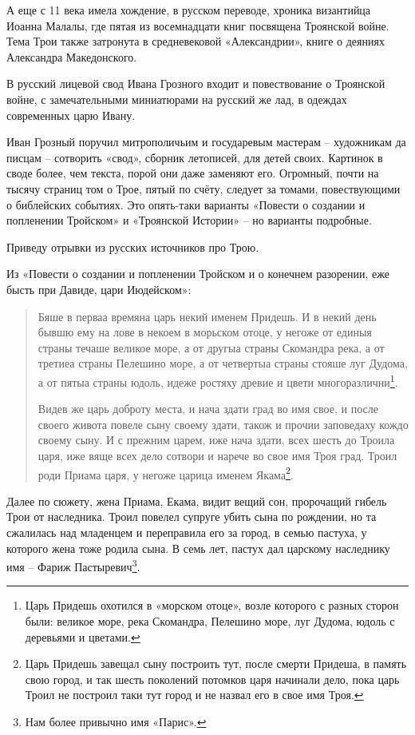 А еще с 11 века имела хождение, в русском переводе, хроника византийца Иоанна Малалы\cite{malala01}, где пятая из восемнадцати книг посвящена Троянской войне. Тема Трои также затронута в средневековой «Александрии», книге о деяниях Александра Македонского.

В русский лицевой свод Ивана Грозного входит и повествование о Троянской войне, с замечательными миниатюрами на русский же лад, в одеждах современных царю Ивану.

Иван Грозный поручил митрополичьим и государевым мастерам – художникам да писцам – сотворить «свод», сборник летописей, для детей своих. Картинок в своде более, чем текста, порой они даже заменяют его. Огромный, почти на тысячу страниц том о Трое, пятый по счёту, следует за томами, повествующими о библейских событиях. Это опять-таки варианты «Повести о создании и попленении Тройском» и «Троянской Истории» – но варианты подробные.

Приведу отрывки из русских источников про Трою.

Из «Повести о создании и попленении Тройском
и о конечнем разорении, еже бысть при Давиде,
цари Июдейском»\cite{troyaskaz}:

\begin{quotation}
Бяше в перваа времяна царь некий именем Придешь. И в некий день бывшю ему на лове в некоем в морьском отоце, у негоже от единыя страны течаше великое море, а от другыа страны Скомандра река, а от третиеа страны Пелешино море, а от четвертыа страны стояше луг Дудома, а от пятыа страны юдоль, идеже ростяху древие и цвети многоразлични\footnote{Царь Придешь охотился в «морском отоце», возле которого с разных сторон были: великое море, река Скомандра, Пелешино море, луг Дудома, юдоль с деревьями и цветами.}.

Видев же царь доброту места, и нача здати град во имя свое, и после своего живота повеле сыну своему здати, також и прочии заповедаху кождо своему сыну. И с прежним царем, иже нача здати, всех шесть до Троила царя, иже вяще всех дело сотвори и нарече во свое имя Троя град. Троил роди Приама царя, у негоже царица именем Якама\footnote{Царь Придешь завещал сыну построить тут, после смерти Придеша, в память свою город, и так шесть поколений потомков царя начинали дело, пока царь Троил не построил таки тут город и не назвал его в свое имя Троя.}.
\end{quotation}

Далее по сюжету, жена Приама, Екама, видит вещий сон, пророчащий гибель Трои от наследника. Троил повелел супруге убить сына по рождении, но та сжалилась над младенцем и переправила его за город, в семью пастуха, у которого жена тоже родила сына. В семь лет, пастух дал царскому наследнику имя – Фариж Пастыревич\footnote{Нам более привычно имя «Парис».}. 

